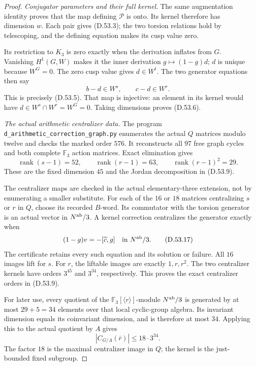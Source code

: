 \begin{proof}
\emph{Conjugator parameters and their full kernel.}
The same augmentation identity proves
that the map defining \(\mathcal P\)
is onto. Its kernel therefore has
dimension \(w\). Each pair gives
(D.53.3); the two torsion relations
hold by telescoping, and the defining
equation makes its cusp value zero.

Its restriction to \(K_3\) is zero
exactly when the derivation inflates
from \(G\). Vanishing \(H^1(G,W)\)
makes it the inner derivation
\(g\mapsto(1-g)d\); \(d\) is unique
because \(W^G=0\).
The zero cusp value gives \(d\in W^t\).
The two generator equations then say
\[
               b-d\in W^s,\qquad c-d\in W^r .
 \tag{D.53.15}
\]
This is precisely (D.53.5). That map is
injective: an element in its kernel
would have \(d\in W^s\cap W^r=W^G=0\).
Taking dimensions proves (D.53.6).

\emph{The actual arithmetic centralizer data.}
The program
\texttt{d\_arithmetic\_correction\_graph.py}
enumerates the actual \(Q\) matrices modulo
twelve and checks the marked order \(576\).
It reconstructs all \(97\) free graph
cycles and both complete \(\mathbb F_3\)
action matrices. Exact elimination gives
\[
 \operatorname{rank}(s-1)=52,\qquad
 \operatorname{rank}(r-1)=63,\qquad
 \operatorname{rank}(r-1)^2=29 .
 \tag{D.53.16}
\]
These are the fixed dimension \(45\)
and the Jordan decomposition in (D.53.9).

The centralizer maps are checked in the
actual elementary-three extension, not
by enumerating a smaller substitute.
For each of the \(16\) or \(18\) matrices
centralizing \(s\) or \(r\) in \(Q\),
choose its recorded \(B\)-word.
Its commutator with the torsion generator
is an actual vector in \(N^{\rm ab}/3\).
A kernel correction centralizes the
generator exactly when
\[
              (1-g)v=-[\widetilde c,g]
                   \quad\hbox{in }N^{\rm ab}/3 .
 \tag{D.53.17}
\]
The certificate retains every such
equation and its solution or failure.
All \(16\) images lift for \(s\).
For \(r\), the liftable images are
exactly \(1,r,r^2\).
The two centralizer kernels have orders
\(3^{45}\) and \(3^{34}\), respectively.
This proves the exact centralizer
orders in (D.53.9).

For later use, every quotient of the
\(\mathbb F_3[\langle r\rangle]\)-module
\(N^{\rm ab}/3\) is generated by at most
\(29+5=34\) elements over that local
cyclic-group algebra. Its invariant
dimension equals its coinvariant
dimension, and is therefore at most
\(34\). Applying this to the actual
quotient by \(A\) gives
\[
             |C_{G/A}(\bar r)|\le18\cdot3^{34}.
 \tag{D.53.18}
\]
The factor \(18\) is the maximal
centralizer image in \(Q\); the kernel
is the just-bounded fixed subgroup.


\end{proof}
